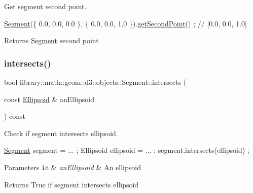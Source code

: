 Get segment second point. 


\begin{DoxyCode}
\hyperlink{classlibrary_1_1math_1_1geom_1_1d3_1_1objects_1_1_segment_a5562342d1edf2f52e37ce1bc138ee7d7}{Segment}(\{ 0.0, 0.0, 0.0 \}, \{ 0.0, 0.0, 1.0 \}).\hyperlink{classlibrary_1_1math_1_1geom_1_1d3_1_1objects_1_1_segment_a5d824fed334185975226d8f7e8489ced}{getSecondPoint}() ; \textcolor{comment}{// [0.0, 0.0, 1.0]}
\end{DoxyCode}


\begin{DoxyReturn}{Returns}
\hyperlink{classlibrary_1_1math_1_1geom_1_1d3_1_1objects_1_1_segment}{Segment} second point 
\end{DoxyReturn}
\mbox{\label{classlibrary_1_1math_1_1geom_1_1d3_1_1objects_1_1_segment_af6d7eb00a6886d190c03e8b8e4220f33}} 
\subsubsection{\texorpdfstring{intersects()}{intersects()}}
{\footnotesize\ttfamily bool library\+::math\+::geom\+::d3\+::objects\+::\+Segment\+::intersects (\begin{DoxyParamCaption}\item[{const \hyperlink{classlibrary_1_1math_1_1geom_1_1d3_1_1objects_1_1_ellipsoid}{Ellipsoid} \&}]{an\+Ellipsoid }\end{DoxyParamCaption}) const}



Check if segment intersects ellipsoid. 


\begin{DoxyCode}
\hyperlink{classlibrary_1_1math_1_1geom_1_1d3_1_1objects_1_1_segment_a5562342d1edf2f52e37ce1bc138ee7d7}{Segment} segment = ... ;
Ellipsoid ellipsoid = ... ;
segment.intersects(ellipsoid) ;
\end{DoxyCode}



\begin{DoxyParams}[1]{Parameters}
\mbox{\tt in}  & {\em an\+Ellipsoid} & An ellipsoid \\
\hline
\end{DoxyParams}
\begin{DoxyReturn}{Returns}
True if segment intersects ellipsoid 
\end{DoxyReturn}
\mbox{\label{classlibrary_1_1math_1_1geom_1_1d3_1_1objects_1_1_segment_a70a29c3822e4859a2e8cd4a52e1b26f5}} 
